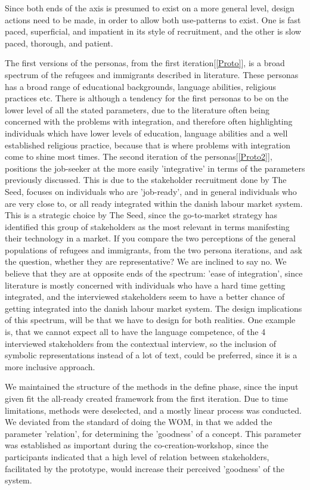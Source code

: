 \newpage
Since both ends of the axis is presumed to exist on a more general level, design actions need to be made, in order to allow both use-patterns to exist. One is fast paced, superficial, and impatient in its style of recruitment, and the other is slow paced, thorough, and patient.

The first versions of the personas, from the first iteration[\ref{Proto}], is a broad spectrum of the refugees and immigrants described in literature. These personas has a broad range of educational backgrounds, language abilities, religious practices etc. There is although a tendency for the first personas to be on the lower level of all the stated parameters, due to the literature often being concerned with the problems with integration, and therefore often highlighting individuals which have lower levels of education, language abilities and a well established religious practice, because that is where problems with integration come to shine most times. The second iteration of the personas[\ref{Proto2}], positions the job-seeker at the more easily 'integrative' in terms of the parameters previously discussed. This is due to the stakeholder recruitment done by The Seed, focuses on individuals who are 'job-ready', and in general individuals who are very close to, or all ready integrated within the danish labour market system. This is a strategic choice by The Seed, since the go-to-market strategy has identified this group of stakeholders as the most relevant in terms manifesting their technology in a market. If you compare the two perceptions of the general populations of refugees and immigrants, from the two persona iterations, and ask the question, whether they are representative? We are inclined to say no. We believe that they are at opposite ends of the spectrum: 'ease of integration', since literature is mostly concerned with individuals who have a hard time getting integrated, and the interviewed stakeholders seem to have a better chance of getting integrated into the danish labour market system. The design implications of this spectrum, will be that we have to design for both realities. One example is, that we cannot expect all to have the language competence, of the 4 interviewed stakeholders from the contextual interview, so the inclusion of symbolic representations instead of a lot of text, could be preferred, since it is a more inclusive approach. 

We maintained the structure of the methods in the define phase, since the input given fit the all-ready created framework from the first iteration. Due to time limitations, methods were deselected, and a mostly linear process was conducted. We deviated from the standard of doing the WOM, in that we added the parameter 'relation', for determining the 'goodness' of a concept. This parameter was established as important during the co-creation-workshop, since the participants indicated that a high level of relation between stakeholders, facilitated by the prototype, would increase their perceived 'goodness' of the system. 

